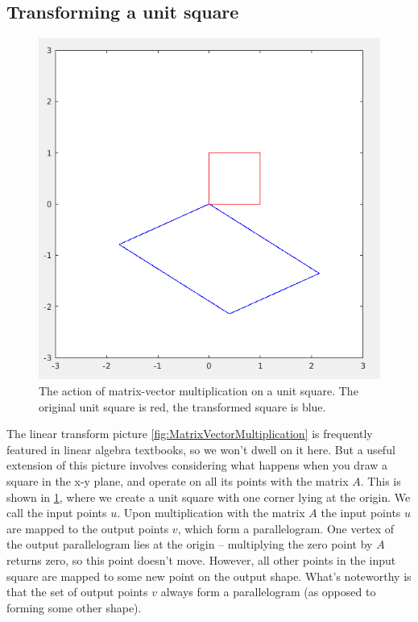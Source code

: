 \documentclass[onefignum,onetabnum]{siamart190516}
\begin{document}
\subsection{Transforming a unit square}
\begin{figure}[thb]
	\centering
	\includegraphics[width=0.7\columnwidth]{MatrixActionOnUnitSquare.png}
	\caption{The action of matrix-vector multiplication on a unit square.  
		The original unit square is red, the transformed square is blue.}
	\label{fig:MatrixActionOnUnitSquare}
\end{figure}
The linear transform picture
\cref{fig:MatrixVectorMultiplication} is frequently featured in 
linear algebra textbooks, so we
won't dwell on it here.  But a useful extension of this
picture involves considering what happens when you draw a square in
the x-y plane, and operate on all its points with the matrix
$A$.  This is shown in \cref{fig:MatrixActionOnUnitSquare}, 
where we create a unit square with
one corner lying at the origin.  We call the input points $u$.
Upon multiplication with the matrix $A$
the input points $u$ are mapped to the output points $v$,
which form a parallelogram.  One vertex of the output parallelogram lies at
the origin -- multiplying the zero
point by $A$ returns zero, so this point doesn't move.  However, all
other points in the input square are mapped to some new point on the
output shape.  What's noteworthy is that the set of output points $v$ always
form a parallelogram (as opposed to forming some other shape).
\FloatBarrier
\end{document}

